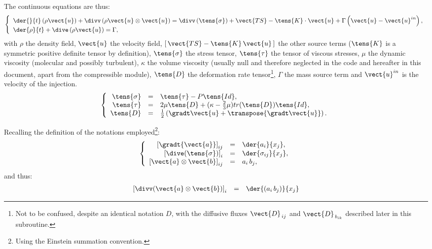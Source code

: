 The continuous equations are thus:
\begin{equation}
  \label{eq:continuousnavstv}
\left\{
\begin{array}{l}
\displaystyle \der{}{t} \left( \rho \vect{u} \right) + \divv \left( \rho  \vect{u} \otimes \vect{u} \right)
=\divv \left( \tens{\sigma} \right) + \vect{TS} - \tens{K} \cdot \vect{u} + \Gamma \left( \vect{u} - \vect{u}^{in}\right),\\
\der{\rho}{t} + \dive \left( \rho \vect{u} \right) = \Gamma ,
\end{array}\right.
\end{equation}
%
with $\rho$ the density field, $\vect{u}$ the velocity field,
$[\,\vect{TS}-\tens{K}\,\vect{u}\,]$ the other source terms ($\tens{K}$ is a
symmetric positive definite tensor by definition), $\tens{\sigma}$ the stress tensor,
$\tens{\tau}$ the tensor of viscous stresses,
$\mu$ the dynamic viscosity (molecular and possibly turbulent),
$\kappa$ the volume viscosity (usually null and therefore neglected in
the code and hereafter in this document, apart from the compressible module),
$\tens{D}$ the deformation rate tensor\footnote{Not to be confused,
despite an identical notation $D$, with the diffusive fluxes
$\vect{D}_{\,ij}$ and $\vect{D}_{\,{b}_{ik}}$ described later in this
subroutine.}, $\Gamma$ the mass source term and $\vect{u}^{in}$ is the velocity of the injection.
\begin{equation}
\left\{
\begin{array}{r c l}
\tens{\sigma} & = & \tens{\tau} - P\tens{Id} ,  \\
\tens{\tau} & = & 2 \mu  \tens{D} +  (\kappa  - \frac{2}{3}\mu) tr({\tens{D}})
\tens{Id} , \\
\tens{D} &=& \frac{1}{2}\left( \gradt\vect{u}+ \transpose{\gradt\vect{u}} \right).
\end{array}\right.
\end{equation}

Recalling the definition of the notations employed\footnote{Using the
Einstein summation convention.}:
\begin{equation}\notag
\left\{\begin{array}{r c l}
\left[\gradt{\vect{a}}\right]_{ij} &=& \der{a_i}{x_j},\\
\left[\dive(\tens{\sigma})\right]_i &=& \der{\sigma_{ij}}{x_j},\\
\left[\vect{a}\otimes\vect{b}\right]_{ij} &= &
a_i\,b_j,\\
\end{array}\right.
\end{equation}
and thus:
\begin{equation}\notag
\begin{array}{lll}
\left[\divv(\vect{a}\otimes\vect{b})\right]_i &= &
\der{(a_i\,b_j)}{x_j}
\end{array}
\end{equation}

